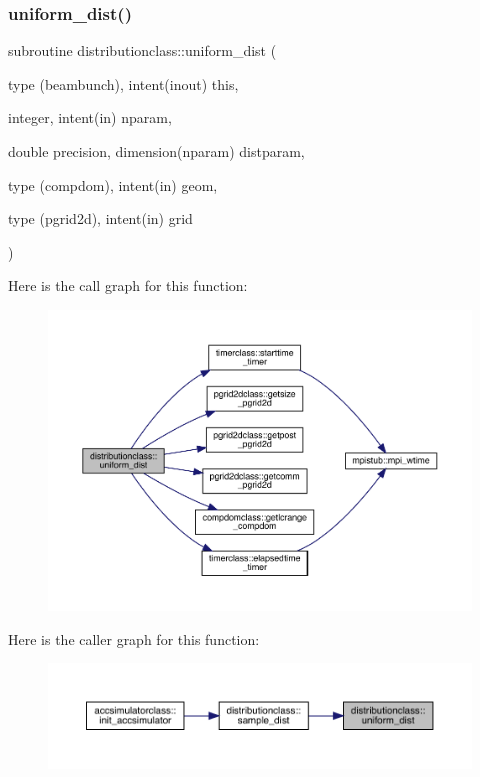 \subsubsection{\texorpdfstring{uniform\_dist()}{uniform\_dist()}}
{\footnotesize\ttfamily subroutine distributionclass\+::uniform\+\_\+dist (\begin{DoxyParamCaption}\item[{type (beambunch), intent(inout)}]{this,  }\item[{integer, intent(in)}]{nparam,  }\item[{double precision, dimension(nparam)}]{distparam,  }\item[{type (compdom), intent(in)}]{geom,  }\item[{type (pgrid2d), intent(in)}]{grid }\end{DoxyParamCaption})}

Here is the call graph for this function\+:\nopagebreak
\begin{figure}[H]
\begin{center}
\leavevmode
\includegraphics[width=350pt]{namespacedistributionclass_a4a013e2bf1afc4cdeefe0fce7f0e0e00_cgraph}
\end{center}
\end{figure}
Here is the caller graph for this function\+:\nopagebreak
\begin{figure}[H]
\begin{center}
\leavevmode
\includegraphics[width=350pt]{namespacedistributionclass_a4a013e2bf1afc4cdeefe0fce7f0e0e00_icgraph}
\end{center}
\end{figure}
\mbox{\label{namespacedistributionclass_aed734df6d00f7004cf11847adb42dd1d}} 

